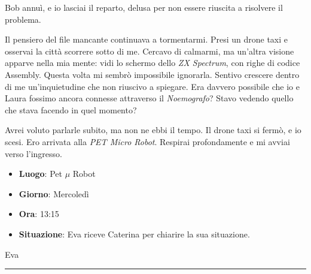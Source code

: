 Bob annuì, e io lasciai il reparto, delusa per non essere riuscita a risolvere il problema.

Il pensiero del file mancante continuava a tormentarmi. Presi un drone taxi e osservai la città scorrere sotto di me. Cercavo di calmarmi, ma un'altra visione apparve nella mia mente: vidi lo schermo dello \emph{ZX Spectrum}, con righe di codice Assembly. Questa volta mi sembrò impossibile ignorarla. Sentivo crescere dentro di me un'inquietudine che non riuscivo a spiegare. Era davvero possibile che io e Laura fossimo ancora connesse attraverso il \emph{Noemografo}? Stavo vedendo quello che stava facendo in quel momento?

Avrei voluto parlarle subito, ma non ne ebbi il tempo. Il drone taxi si fermò, e io scesi. Ero arrivata alla \emph{PET Micro Robot}. Respirai profondamente e mi avviai verso l'ingresso.
\newpage
\begin{tcolorbox}[colback=gray!5,colframe=gray!80,title=\textbf{Scheda Informativa}]

    \begin{itemize}
        \item \textbf{Luogo}: Pet $\mu$ Robot
        \item \textbf{Giorno}: Mercoledì
        \item \textbf{Ora}: 13:15
        \item \textbf{Situazione}: Eva riceve Caterina per chiarire la sua situazione.
    \end{itemize}

\end{tcolorbox}
\vspace{1em}
\begin{center}Eva\end{center}
\hrule
\vspace{1em}
\begin{center}
\begin{minipage}{0.7\textwidth}
    \centering
    
\end{minipage}
\end{center}

